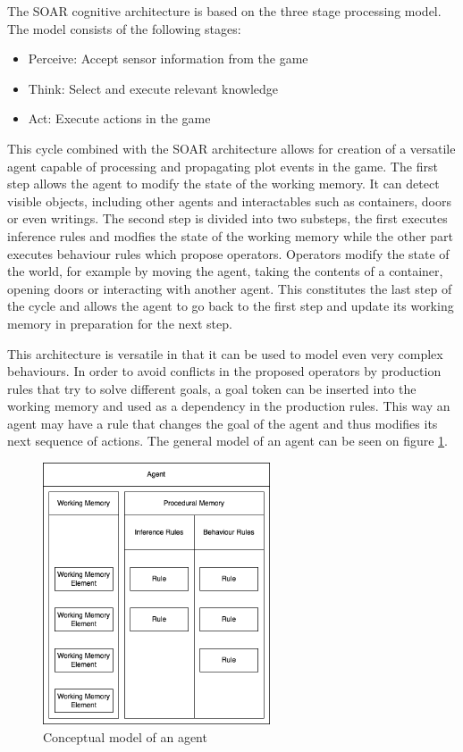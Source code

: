 \label{chapter:chapter1}

The SOAR cognitive architecture is based on the three stage processing model.
The model consists of the following stages:

\begin{itemize}
    \item Perceive: Accept sensor information from the game
    \item Think: Select and execute relevant knowledge
    \item Act: Execute actions in the game
\end{itemize}

This cycle combined with the SOAR architecture allows for creation of a versatile agent capable of processing and propagating plot events in the game.
The first step allows the agent to modify the state of the working memory.
It can detect visible objects, including other agents and interactables such as containers, doors or even writings.
The second step is divided into two substeps, the first executes inference rules and modfies the state of the working memory while the other part executes behaviour rules which propose operators.
Operators modify the state of the world, for example by moving the agent, taking the contents of a container, opening doors or interacting with another agent.
This constitutes the last step of the cycle and allows the agent to go back to the first step and update its working memory in preparation for the next step.

This architecture is versatile in that it can be used to model even very complex behaviours.
In order to avoid conflicts in the proposed operators by production rules that try to solve different goals, a goal token can be inserted into the working memory and used as a dependency in the production rules.
This way an agent may have a rule that changes the goal of the agent and thus modifies its next sequence of actions.
The general model of an agent can be seen on figure \ref{fig:agent.drawio.png}.

\begin{figure}[H]
    \centering
    \includegraphics[width=0.6\textwidth]{images/chapter1/agent.drawio.png}
    \caption{Conceptual model of an agent}\label{fig:agent.drawio.png}
\end{figure}

